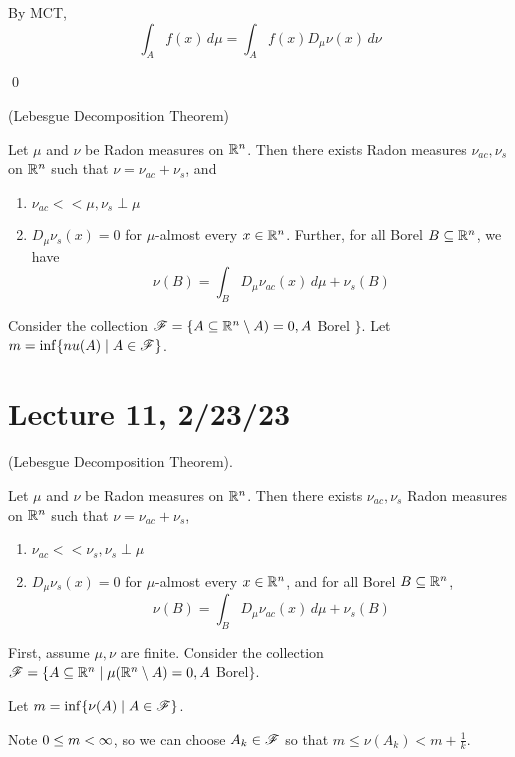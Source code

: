 \documentclass[x11names,reqno,14pt]{extarticle}
\newcommand{\Dmn}{D_\mu\nu}
\begin{document}
By MCT, 
\[
\int_Af(x)\,d\mu = \int_Af(x)\Dmn(x)\,d\nu
\]

\qed

\thm (Lebesgue Decomposition Theorem)

Let $\mu$ and $\nu$ be Radon measures on $\mathbb{R}^n$. Then there exists Radon measures $\nu_{ac},\nu_s$ on $\mathbb{R}^n$ such that $\nu = \nu_{ac} + \nu_s$, and 
\begin{enumerate}

\item $\nu_{ac} << \mu, \nu_s \perp \mu$ 

\item $\Dmn_s(x) = 0$ for $\mu$-almost every $x \in \mathbb{R}^n$. Further, for all Borel $B \subseteq\mathbb{R}^n$, we have 
\[
\nu(B) = \int_B\Dmn_{ac}(x)\,d\mu + \nu_s(B)
\]

\end{enumerate}

\proof

Consider the collection $\mathscr{F} = \{A\subseteq \mathbb{R}^n\setminus A) = 0, A$ Borel $\}$. Let $m = \inf\{nu(A) \mid A \in \mathscr{F}\}$.





\section*{Lecture 11, 2/23/23}

\thm (Lebesgue Decomposition Theorem). 

Let $\mu$ and $\nu$ be Radon measures on $\mathbb{R}^n$. Then there exists $\nu_{ac}, \nu_s$ Radon measures on $\mathbb{R}^n$ such that $\nu = \nu_{ac} + \nu_s$, 
\begin{enumerate}

\item $\nu_{ac}<<\nu_{s}, \nu_s\perp\mu$

\item $\Dmn_s(x) = 0$ for $\mu$-almost every $x \in\mathbb{R}^n$, and for all Borel $B \subseteq \mathbb{R}^n$, 
\[
\nu(B) = \int_B\Dmn_{ac}(x)\,d\mu + \nu_s(B)
\]

\end{enumerate}

\proof

First, assume $\mu,\nu$ are finite. Consider the collection $\mathscr{F} = \{A\subseteq\mathbb{R}^n \mid \mu(\mathbb{R}^n\setminus A) = 0, A$ Borel$\}$. 

Let $m = \inf\{\nu(A)\mid A\in\mathscr{F}\}$. 

Note $0 \leq m < \infty$, so we can choose $A_k\in\mathscr{F}$ so that $m \leq \nu(A_k) < m + \frac{1}{k}$. 
\end{document}
